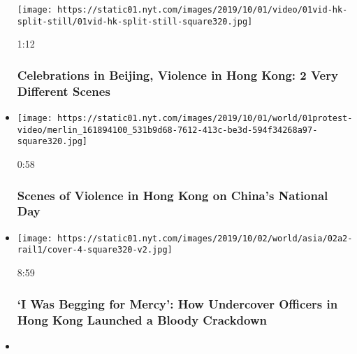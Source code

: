 \begin{itemize}
  \texttt{[image: https://static01.nyt.com/images/2019/10/01/video/01vid-hk-split-still/01vid-hk-split-still-square320.jpg]}

  1:12

  \hypertarget{celebrations-in-beijing-violence-in-hong-kong-2-very-different-scenes}{%
  \subsubsection{Celebrations in Beijing, Violence in Hong Kong: 2 Very
  Different
  Scenes}\label{celebrations-in-beijing-violence-in-hong-kong-2-very-different-scenes}}
\item
  \href{https://www.nytimes.com/video/world/asia/100000006745666/hong-kong-protest-china.html?action=click\&module=video-series-bar\&region=header\&pgtype=Article\&playlistId=video/hk-protest}{}

  \texttt{[image: https://static01.nyt.com/images/2019/10/01/world/01protest-video/merlin\_161894100\_531b9d68-7612-413c-be3d-594f34268a97-square320.jpg]}

  0:58

  \hypertarget{scenes-of-violence-in-hong-kong-on-chinas-national-day}{%
  \subsubsection{Scenes of Violence in Hong Kong on China's National
  Day}\label{scenes-of-violence-in-hong-kong-on-chinas-national-day}}
\item
  \href{https://www.nytimes.com/video/world/asia/100000006702862/hong-kong-protests-police-officers.html?action=click\&module=video-series-bar\&region=header\&pgtype=Article\&playlistId=video/hk-protest}{}

  \texttt{[image: https://static01.nyt.com/images/2019/10/02/world/asia/02a2-rail1/cover-4-square320-v2.jpg]}

  8:59

  \hypertarget{i-was-begging-for-mercy-how-undercover-officers-in-hong-kong-launched-a-bloody-crackdown}{%
  \subsubsection{`I Was Begging for Mercy': How Undercover Officers in
  Hong Kong Launched a Bloody
  Crackdown}\label{i-was-begging-for-mercy-how-undercover-officers-in-hong-kong-launched-a-bloody-crackdown}}
\item
  \href{https://www.nytimes.com/video/world/asia/100000006696918/extradition-bill-hong-kong.html?action=click\&module=video-series-bar\&region=header\&pgtype=Article\&playlistId=video/hk-protest}{}


\end{itemize}
